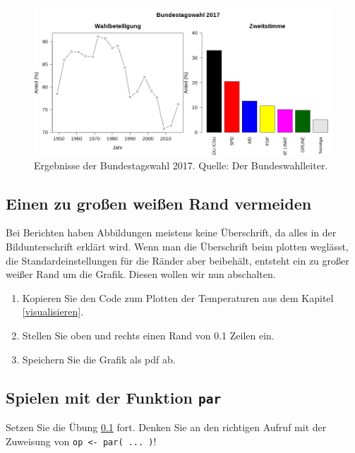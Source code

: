 \documentclass[]{book}
\providecommand{\tightlist}{%
  \setlength{\itemsep}{0pt}\setlength{\parskip}{0pt}}
\begin{document}
\begin{figure}
\includegraphics[width=1\linewidth]{Zwei_grafiken} \caption{Ergebnisse der Bundestagswahl 2017. Quelle: Der Bundeswahlleiter.}\label{fig:zweigrafiken}
\end{figure}

\hypertarget{weisserrand}{%
\subsection{Einen zu großen weißen Rand vermeiden}\label{weisserrand}}

Bei Berichten haben Abbildungen meistens keine Überschrift, da alles in der Bildunterschrift erklärt wird. Wenn man die Überschrift beim plotten weglässt, die Standardeinstellungen für die Ränder aber beibehält, entsteht ein zu großer weißer Rand um die Grafik. Diesen wollen wir nun abschalten.

\begin{enumerate}
\def\labelenumi{\arabic{enumi}.}
\tightlist
\item
  Kopieren Sie den Code zum Plotten der Temperaturen aus dem Kapitel \ref{visualisieren}.
\item
  Stellen Sie oben und rechts einen Rand von 0.1 Zeilen ein.
\item
  Speichern Sie die Grafik als pdf ab.
\end{enumerate}

\hypertarget{spielen-mit-der-funktion-par}{%
\subsection{\texorpdfstring{Spielen mit der Funktion \texttt{par}}{Spielen mit der Funktion par}}\label{spielen-mit-der-funktion-par}}

Setzen Sie die Übung \ref{weisserrand} fort. Denken Sie an den richtigen Aufruf mit der Zuweisung von \texttt{op\ \textless{}-\ par(\ ...\ )}!
\end{document}
